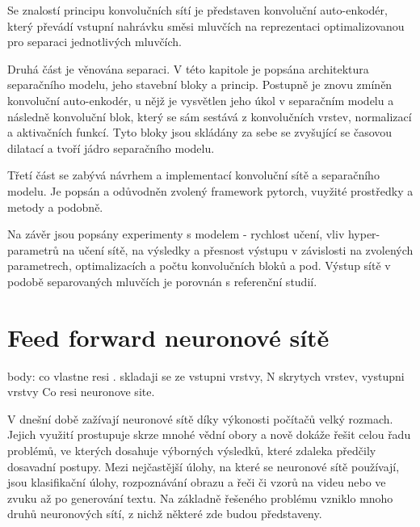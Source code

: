 Se znalostí principu konvolučních sítí je představen konvoluční auto-enkodér, který převádí vstupní nahrávku směsi mluvčích na reprezentaci optimalizovanou pro separaci jednotlivých mluvčích.

Druhá část je věnována separaci. V této kapitole je popsána architektura separačního modelu, jeho stavební bloky a princip. Postupně je znovu zmíněn konvoluční auto-enkodér, u nějž je vysvětlen jeho úkol v separačním modelu a následně konvoluční blok, který se sám sestává z konvolučních vrstev, normalizací a aktivačních funkcí. Tyto bloky jsou skládány za sebe se zvyšující se časovou dilatací a tvoří jádro separačního modelu.

Třetí část se zabývá návrhem a implementací konvoluční sítě a separačního modelu. Je popsán a odůvodněn zvolený framework pytorch, vuyžité prostředky a metody a podobně.

Na závěr jsou popsány experimenty s modelem - rychlost učení, vliv hyper-parametrů na učení sítě, na výsledky a přesnost výstupu v závislosti na zvolených parametrech, optimalizacích a počtu konvolučních bloků a pod. Výstup sítě v podobě separovaných mluvčích je porovnán s referenční studií.


\chapter{Feed forward neuronové sítě}
\label{neuronovky}
body: co vlastne resi . skladaji se ze vstupni vrstvy, N skrytych vrstev, vystupni vrstvy
Co resi neuronove site.

V dnešní době zažívají neuronové sítě díky výkonosti počítačů velký rozmach. Jejich využití prostupuje skrze mnohé vědní obory a nově dokáže řešit celou řadu problémů, ve kterých dosahuje výborných výsledků, které zdaleka předčily dosavadní postupy. Mezi nejčastější úlohy, na které se neuronové sítě používají, jsou klasifikační úlohy, rozpoznávání obrazu a řeči či vzorů na videu nebo ve zvuku až po generování textu. Na základně řešeného problému vzniklo mnoho druhů neuronových sítí, z nichž některé zde budou představeny.

